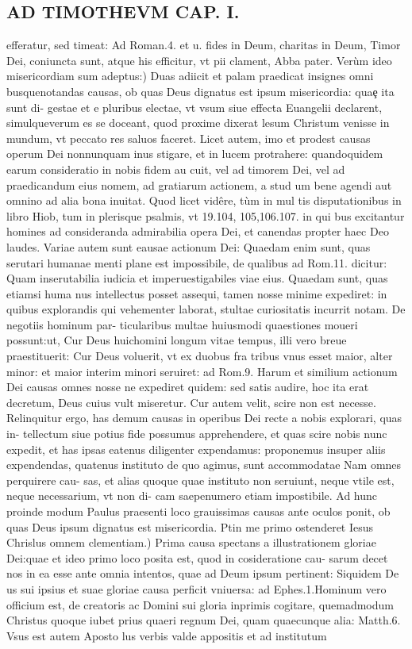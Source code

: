 \documentclass{article}
\begin{document}
\begin{pages}
\section*{AD TIMOTHEVM CAP. I. }
\marginpar{[ p.54 ]}
\marginpar{[ p.55 ]}\pstart efferatur, sed timeat: Ad Roman.4. et u. fides in Deum, charitas in Deum, Timor Dei, coniuncta sunt, atque  his efficitur, vt pii clament, Abba pater.  \pend\pstart Verùm ideo misericordiam sum adeptus:) Duas adiicit et palam praedicat insignes omni busquenotandas causas, ob quas Deus dignatus est ipsum misericordia: quaȩ ita sunt di- gestae et e pluribus electae, vt vsum siue effecta Euangelii declarent, simulqueverum es se doceant, quod proxime dixerat lesum Christum venisse in mundum, vt peccato res saluos faceret. Licet autem, imo et prodest causas operum Dei nonnunquam inus stigare, et in lucem protrahere: quandoquidem earum consideratio in nobis fidem au cuit, vel ad timorem Dei, vel ad praedicandum eius nomem, ad gratiarum actionem, a stud um bene agendi aut omnino ad alia bona inuitat. Quod licet vidêre, tùm in mul tis disputationibus  in libro Hiob, tum in plerisque  psalmis, vt 19.104, 105,106.107. in qui bus excitantur homines ad consideranda admirabilia opera Dei, et canendas propter haec Deo laudes. Variae autem sunt eausae actionum Dei: Quaedam enim sunt, quas serutari humanae menti plane est impossibile, de qualibus ad Rom.11. dicitur: Quam inserutabilia iudicia et imperuestigabiles viae eius. Quaedam sunt, quas etiamsi huma nus intellectus posset assequi, tamen nosse minime expediret: in quibus explorandis qui vehementer laborat, stultae curiositatis incurrit notam. De negotiis hominum par- ticularibus multae huiusmodi quaestiones moueri possunt:ut, Cur Deus huichomini longum vitae tempus, illi vero breue praestituerit: Cur Deus voluerit, vt ex duobus fra tribus vnus esset maior, alter minor: et maior interim minori seruiret: ad Rom.9. Harum et similium actionum Dei causas omnes nosse ne expediret quidem: sed satis audire, hoc ita erat decretum, Deus cuius vult miseretur. Cur autem velit, scire non est necesse. Relinquitur ergo, has demum causas in operibus Dei recte a nobis explorari, quas in- tellectum siue potius fide possumus apprehendere, et quas scire nobis nunc expedit, et has ipsas eatenus diligenter expendamus: proponemus insuper aliis expendendas, quatenus instituto de quo agimus, sunt accommodatae Nam omnes perquirere cau- sas, et alias quoque  quae instituto non seruiunt, neque  vtile est, neque  necessarium, vt non di- cam saepenumero etiam impostibile. Ad hunc proinde modum Paulus praesenti loco grauissimas causas ante oculos ponit, ob quas Deus ipsum dignatus est misericordia.  \pend\pstart Ptin me primo ostenderet Iesus Chrislus omnem clementiam.) Prima causa spectans a illustrationem gloriae Dei:quae et ideo primo loco posita est, quod in cosideratione cau- sarum decet nos in ea esse ante omnia intentos, quae ad Deum ipsum pertinent: Siquidem De us sui ipsius et suae gloriae causa perficit vniuersa: ad Ephes.1.Hominum vero officium est, de creatoris ac Domini sui gloria inprimis cogitare, quemadmodum Christus quoque  iubet prius quaeri regnum Dei, quam quaecunque  alia: Matth.6. Vsus est autem Aposto lus verbis valde appositis et ad institutum 
\end{pages}
\end{document}
